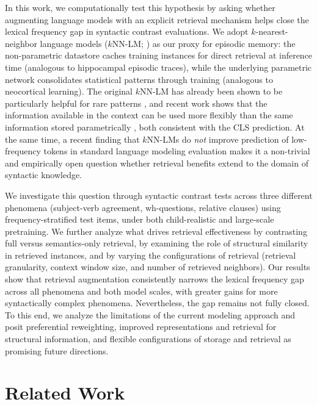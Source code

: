 In this work, we computationally test this hypothesis by asking whether augmenting language models with an explicit retrieval mechanism helps close the lexical frequency gap in syntactic contrast evaluations. We adopt $k$-nearest-neighbor language models ($k$NN-LM; \citealt{khandelwal2020knnlm}) as our proxy for episodic memory: the non-parametric datastore caches training instances for direct retrieval at inference time (analogous to hippocampal episodic traces), while the underlying parametric network consolidates statistical patterns through training (analogous to neocortical learning). The original $k$NN-LM has already been shown to be particularly helpful for rare patterns \citep{mallen2023trust,kandpal2023large}, and recent work shows that the information available in the context can be used more flexibly than the same information stored parametrically \citep{lampinen2025latent,chan2022transformers}, both consistent with the CLS prediction. At the same time, a recent finding that $k$NN-LMs do \textit{not} improve prediction of low-frequency tokens in standard language modeling evaluation \citep{nishida2025long} makes it a non-trivial and empirically open question whether retrieval benefits extend to the domain of syntactic knowledge.


We investigate this question through syntactic contrast tests across three different phenomena (subject-verb agreement, wh-questions, relative clauses) using frequency-stratified test items, under both child-realistic and large-scale pretraining. We further analyze what drives retrieval effectiveness by contrasting full versus semantics-only retrieval, by examining the role of structural similarity in retrieved instances, and by varying the configurations of retrieval (retrieval granularity, context window size, and number of retrieved neighbors). Our results show that retrieval augmentation consistently narrows the lexical frequency gap across all phenomena and both model scales, with greater gains for more syntactically complex phenomena. Nevertheless, the gap remains not fully closed. To this end, we analyze the limitations of the current modeling approach and posit preferential reweighting, improved representations and retrieval for structural information, and flexible configurations of storage and retrieval as promising future directions.






\section{Related Work}

